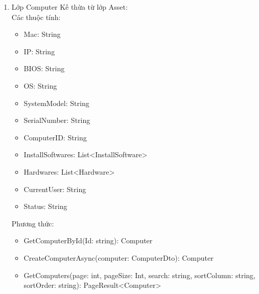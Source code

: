 \begin{enumerate}
\begin{itemize}[label=--]
        \item AlertType: String
    \end{itemize}
    Phương thức:
    \begin{itemize}[label=--]
        \item GetAlertById (Id: string) : Alert
        \item  CreateAlertAsync (alert: AlertDto): Alert
        \item GetAlerts (page: int, pageSize: Int, search: string, sortColumn: string, sortOrder: string): PageResult<AlertDto>
        \item GetAlertsByComputerId(page: int, pageSize: Int, search: string, sortColumn: string, sortOrder: string, computerId: string): PageResult<AlertDto>
    \end{itemize}
    Mối quan hệ tham gia:
    \begin{itemize}[label=--]
        \item Compostion với lớp Threshold, lớp Computer
    \end{itemize}
    \item Lớp Computer Kế thừa từ lớp Asset:\\
    Các thuộc tính:
    \begin{itemize}[label=--]
        \item Mac: String
        \item IP: String
        \item BIOS: String
        \item OS: String
        \item SystemModel: String
        \item SerialNumber: String
         \item ComputerID: String
         \item InstallSoftwares: List<InstallSoftware>
        \item Hardwares: List<Hardware>
        \item CurrentUser: String
        \item Status: String
    \end{itemize}
    Phương thức:
    \begin{itemize}[label=--]
        \item GetComputerById(Id: string): Computer
        \item CreateComputerAsync(computer: ComputerDto): Computer
        \item GetComputers(page: int, pageSize: Int, search: string, sortColumn: string, sortOrder: string): PageResult<Computer>

\end{itemize}
\end{enumerate}
